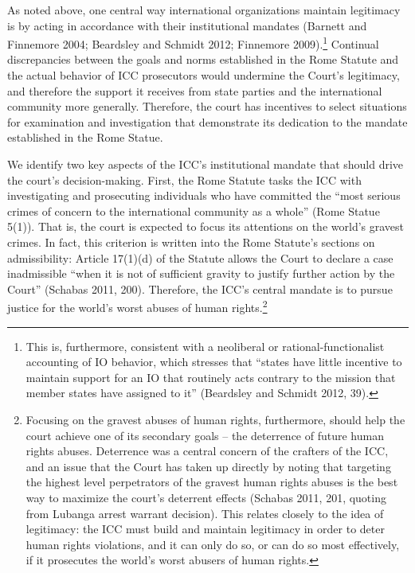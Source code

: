 As noted above, one central way international organizations maintain legitimacy is by acting in accordance with their institutional mandates (Barnett and Finnemore 2004; Beardsley and Schmidt 2012; Finnemore 2009).\footnote{This is, furthermore, consistent with a neoliberal or rational-functionalist accounting of IO behavior, which stresses that ``states have little incentive to maintain support for an IO that routinely acts contrary to the mission that member states have assigned to it'' (Beardsley and Schmidt 2012, 39).} Continual discrepancies between the goals and norms established in the Rome Statute and the actual behavior of ICC prosecutors would undermine the Court's legitimacy, and therefore the support it receives from state parties and the international community more generally.  Therefore, the court has incentives to select situations for examination and investigation that demonstrate its dedication to the mandate established in the Rome Statue.

We identify two key aspects of the ICC's institutional mandate that should drive the court's decision-making.  First, the Rome Statute tasks the ICC with investigating and prosecuting individuals who have committed the ``most serious crimes of concern to the international community as a whole'' (Rome Statue 5(1)).  That is, the court is expected to focus its attentions on the world's gravest crimes.  In fact, this criterion is written into the Rome Statute's sections on admissibility: Article 17(1)(d) of the Statute allows the Court to declare a case inadmissible ``when it is not of sufficient gravity to justify further action by the Court'' (Schabas 2011, 200). Therefore, the ICC's central mandate is to pursue justice for the world's worst abuses of human rights.\footnote{Focusing on the gravest abuses of human rights, furthermore, should help the court achieve one of its secondary goals – the deterrence of future human rights abuses.  Deterrence was a central concern of the crafters of the ICC, and an issue that the Court has taken up directly by noting that targeting the highest level perpetrators of the gravest human rights abuses is the best way to maximize the court's deterrent effects (Schabas 2011, 201, quoting from Lubanga arrest warrant decision). This relates closely to the idea of legitimacy: the ICC must build and maintain legitimacy in order to deter human rights violations, and it can only do so, or can do so most effectively, if it prosecutes the world's worst abusers of human rights.}   

